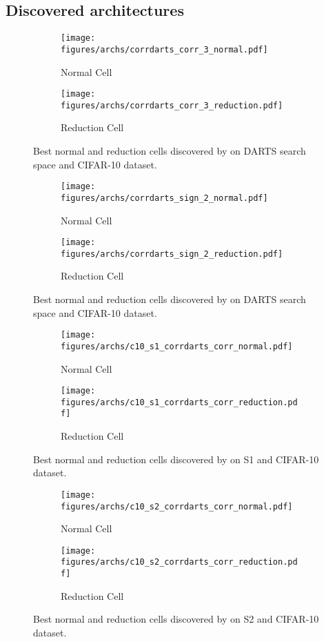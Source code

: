 \documentclass{article} \usepackage{fancyhdr, iclr2023_conference, times}
\begin{document}
\subsection{Discovered architectures}
\label{appndx:archs}
\begin{figure}[h]
    \centering
    \begin{subfigure}[h]{0.5\textwidth}
        \centering
        \texttt{[image: figures/archs/corrdarts\_corr\_3\_normal.pdf]}
        \caption{Normal Cell}
    \end{subfigure}\begin{subfigure}[h]{0.5\textwidth}
        \centering
        \texttt{[image: figures/archs/corrdarts\_corr\_3\_reduction.pdf]}
        \caption{Reduction Cell}
    \end{subfigure}
    \caption{Best normal and reduction cells discovered by  on DARTS search space and CIFAR-10 dataset.}
\end{figure}
\begin{figure}[h]
    \centering
    \begin{subfigure}[h]{0.5\textwidth}
        \centering
        \texttt{[image: figures/archs/corrdarts\_sign\_2\_normal.pdf]}
        \caption{Normal Cell}
    \end{subfigure}\begin{subfigure}[h]{0.5\textwidth}
        \centering
        \texttt{[image: figures/archs/corrdarts\_sign\_2\_reduction.pdf]}
        \caption{Reduction Cell}
    \end{subfigure}
    \caption{Best normal and reduction cells discovered by  on DARTS search space and CIFAR-10 dataset.}
\end{figure}
\begin{figure}[h]
    \centering
    \begin{subfigure}[h]{0.5\textwidth}
        \centering
        \texttt{[image: figures/archs/c10\_s1\_corrdarts\_corr\_normal.pdf]}
        \caption{Normal Cell}
    \end{subfigure}\begin{subfigure}[h]{0.5\textwidth}
        \centering
        \texttt{[image: figures/archs/c10\_s1\_corrdarts\_corr\_reduction.pdf]}
        \caption{Reduction Cell}
    \end{subfigure}
    \caption{Best normal and reduction cells discovered by  on S1 and CIFAR-10 dataset.}
\end{figure}
\begin{figure}[h]
    \centering
    \begin{subfigure}[h]{0.5\textwidth}
        \centering
        \texttt{[image: figures/archs/c10\_s2\_corrdarts\_corr\_normal.pdf]}
        \caption{Normal Cell}
    \end{subfigure}\begin{subfigure}[h]{0.5\textwidth}
        \centering
        \texttt{[image: figures/archs/c10\_s2\_corrdarts\_corr\_reduction.pdf]}
        \caption{Reduction Cell}
    \end{subfigure}
    \caption{Best normal and reduction cells discovered by  on S2 and CIFAR-10 dataset.}
\end{figure}
\end{document}
